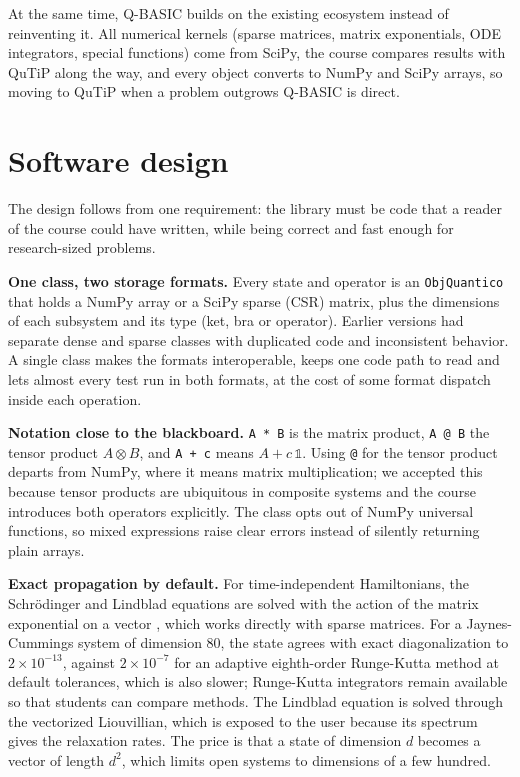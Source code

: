 \documentclass[
]{article}
\begin{document}
At the same time, Q-BASIC builds on the existing ecosystem instead of
reinventing it. All numerical kernels (sparse matrices, matrix
exponentials, ODE integrators, special functions) come from SciPy, the
course compares results with QuTiP along the way, and every object
converts to NumPy and SciPy arrays, so moving to QuTiP when a problem
outgrows Q-BASIC is direct.

\section{Software design}\label{software-design}

The design follows from one requirement: the library must be code that a
reader of the course could have written, while being correct and fast
enough for research-sized problems.

\textbf{One class, two storage formats.} Every state and operator is an
\texttt{ObjQuantico} that holds a NumPy array or a SciPy sparse (CSR)
matrix, plus the dimensions of each subsystem and its type (ket, bra or
operator). Earlier versions had separate dense and sparse classes with
duplicated code and inconsistent behavior. A single class makes the
formats interoperable, keeps one code path to read and lets almost every
test run in both formats, at the cost of some format dispatch inside
each operation.

\textbf{Notation close to the blackboard.} \texttt{A\ *\ B} is the
matrix product, \texttt{A\ @\ B} the tensor product \(A \otimes B\), and
\texttt{A\ +\ c} means \(A + c\,\mathbb{1}\). Using \texttt{@} for the
tensor product departs from NumPy, where it means matrix multiplication;
we accepted this because tensor products are ubiquitous in composite
systems and the course introduces both operators explicitly. The class
opts out of NumPy universal functions, so mixed expressions raise clear
errors instead of silently returning plain arrays.

\textbf{Exact propagation by default.} For time-independent
Hamiltonians, the Schrödinger and Lindblad equations are solved with the
action of the matrix exponential on a vector \citep{almohy2011expmv},
which works directly with sparse matrices. For a Jaynes-Cummings system
\citep{jaynes1963} of dimension 80, the state agrees with exact
diagonalization to \(2\times10^{-13}\), against \(2\times10^{-7}\) for
an adaptive eighth-order Runge-Kutta method \citep{dormand1980rk} at
default tolerances, which is also slower; Runge-Kutta integrators remain
available so that students can compare methods. The Lindblad equation is
solved through the vectorized Liouvillian, which is exposed to the user
because its spectrum gives the relaxation rates. The price is that a
state of dimension \(d\) becomes a vector of length \(d^2\), which
limits open systems to dimensions of a few hundred.
\end{document}
